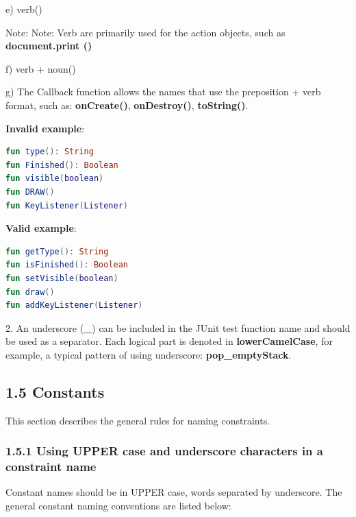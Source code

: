 {{{{{{{{{{{{{{{{e) verb()

Note: Note: Verb are primarily used for the action objects, such as \textbf{document.print ()}



f) verb + noun() 



g) The Callback function allows the names that use the preposition + verb format, such as: \textbf{onCreate()}, \textbf{onDestroy()}, \textbf{toString()}.



\textbf{Invalid example}: 



\begin{lstlisting}[language=Kotlin]
fun type(): String
fun Finished(): Boolean
fun visible(boolean)
fun DRAW()
fun KeyListener(Listener)
\end{lstlisting}


\textbf{Valid example}: 



\begin{lstlisting}[language=Kotlin]
fun getType(): String
fun isFinished(): Boolean
fun setVisible(boolean)
fun draw()
fun addKeyListener(Listener)
\end{lstlisting}


2.	An underscore (\textbf{\_}) can be included in the JUnit test function name and should be used as a separator. Each logical part is denoted in \textbf{lowerCamelCase}, for example, a typical pattern of using underscore: \textbf{pop\_emptyStack}.

\subsection*{\textbf{1.5 Constants}}

\label{sec:1.5}

This section describes the general rules for naming constraints.

\subsubsection*{\textbf{1.5.1 Using UPPER case and underscore characters in a constraint name}}
\leavevmode\newline

\label{sec:1.5.1}

Constant names should be in UPPER case, words separated by underscore. The general constant naming conventions are listed below:

}}}}}}}}}}}}}}}}
